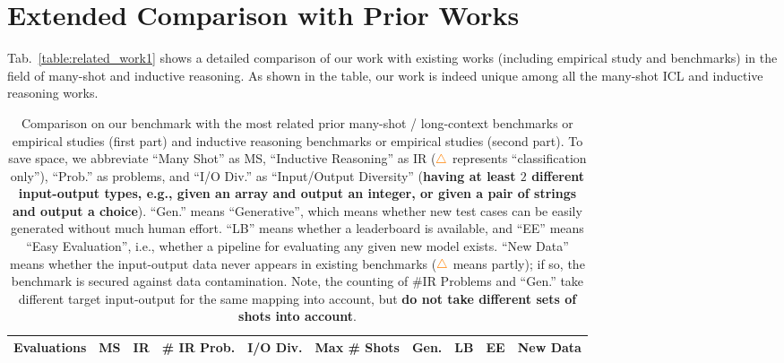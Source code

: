 \section{Extended Comparison with Prior Works}
\label{sec:ext_related_work}

Tab.~\ref{table:related_work1} shows a detailed comparison of our work with existing works (including empirical study and benchmarks) in the field of many-shot and inductive reasoning. As shown in the table, our work is indeed unique among all the many-shot ICL and inductive reasoning works.

\begin{table}
    \setlength{\tabcolsep}{4pt}
    \caption{Comparison on our benchmark with the most related prior many-shot / long-context benchmarks or empirical studies (first part) and inductive reasoning benchmarks or empirical studies (second part). To save space, we abbreviate ``Many Shot'' as MS, ``Inductive Reasoning'' as IR ($\textcolor{orange}{\triangle} $ represents ``classification only''), ``Prob.'' as problems, and ``I/O Div.'' as ``Input/Output Diversity'' (\textbf{having at least $2$ different input-output types, e.g., given an array and output an integer, or given a pair of strings and output a choice}). ``Gen.'' means ``Generative'', which means whether new test cases can be easily generated without much human effort. ``LB'' means whether a leaderboard is available, and ``EE'' means ``Easy Evaluation'', i.e., whether a pipeline for evaluating any given new model exists. ``New Data'' means whether the input-output data never appears in existing benchmarks ($\textcolor{orange}{\triangle}$ means partly); if so, the benchmark is secured against data contamination. Note, the counting of \#IR Problems and ``Gen.'' take different target input-output for the same mapping into account, but \textbf{do not take different sets of shots into account}.}
    \centering
    \begin{tabular}{lccccccccc}
    \toprule
    \textbf{Evaluations} & 
    \textbf{MS} &
    \textbf{IR} &
    \textbf{\# IR Prob.} &
    \textbf{I/O Div.} &
    \textbf{Max \# Shots} & 
    \textbf{Gen.} & 
    \textbf{LB} & \textbf{EE} & 
    \textbf{New Data} 
    \\
    \midrule
   

\end{tabular}
\end{table}
